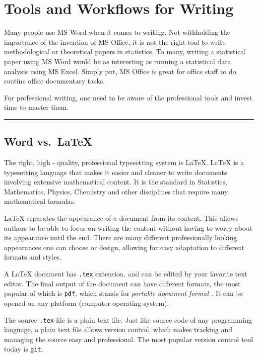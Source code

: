 \documentclass[
]{book}
\theoremstyle{definition}
\theoremstyle{definition}
\theoremstyle{definition}
\theoremstyle{definition}
\theoremstyle{remark}
\begin{document}
\chapter{Tools and Workflows for Writing}\label{ch-tools}

Many people use MS Word when it comes to writing.
Not withholding the importance of the invention of MS Office, it is not the right tool to write methodological or theoretical papers in
statistics. To many, writing a statistical
paper using MS Word would be as interesting as running a statistical data
analysis using MS Excel. Simply put, MS Office is great for office staff to do
routine office documentary tasks.

For professional writing, one need to be aware
of the professional tools and invest time to master them.

\begin{center}\rule{0.5\linewidth}{0.5pt}\end{center}

\section{Word vs.~LaTeX}\label{word-vs.-latex}

The right, high - quality, professional typesetting system is LaTeX. LaTeX is a
typesetting language that makes it easier and cleaner to write documents
involving extensive mathematical content. It is the standard in Statistics, Mathematics, Physics, Chemistry and other disciplines that require many
mathematical formulas.

LaTeX separates the appearance of a document from its content. This allows authors
to be able to focus on writing the content without having to worry about
its appearance until the end. There are many different
professionally looking appearances one can choose or design, allowing for easy
adaptation to different formats and styles.

A LaTeX document has \texttt{.tex} extension, and can be
edited by your favorite text editor. The final output of the document can have
different formats, the most popular of which is \texttt{pdf}, which stands for \emph{
portable
document format } . It can be opened on any platform (computer operating system).

The source \texttt{.tex} file is a plain text file. Just like source code of any
programming language, a plain text file allows version control, which makes
tracking and managing the source easy and professional. The most popular version
control tool today is \texttt{git}.
\end{document}
